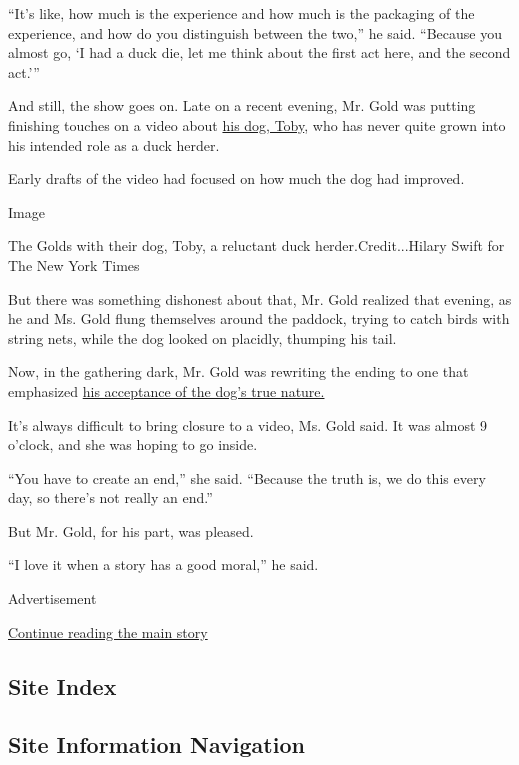 ``It's like, how much is the experience and how much is the packaging of
the experience, and how do you distinguish between the two,'' he said.
``Because you almost go, `I had a duck die, let me think about the first
act here, and the second act.'''

And still, the show goes on. Late on a recent evening, Mr. Gold was
putting finishing touches on a video about
\href{https://www.youtube.com/watch?v=JAX2ARoZoks}{his dog, Toby}, who
has never quite grown into his intended role as a duck herder.

Early drafts of the video had focused on how much the dog had improved.

Image

The Golds with their dog, Toby, a reluctant duck herder.Credit...Hilary
Swift for The New York Times

But there was something dishonest about that, Mr. Gold realized that
evening, as he and Ms. Gold flung themselves around the paddock, trying
to catch birds with string nets, while the dog looked on placidly,
thumping his tail.

Now, in the gathering dark, Mr. Gold was rewriting the ending to one
that emphasized \href{https://www.youtube.com/watch?v=EHMZ6YmiJ8U}{his
acceptance of the dog's true nature.}

It's always difficult to bring closure to a video, Ms. Gold said. It was
almost 9 o'clock, and she was hoping to go inside.

``You have to create an end,'' she said. ``Because the truth is, we do
this every day, so there's not really an end.''

But Mr. Gold, for his part, was pleased.

``I love it when a story has a good moral,'' he said.

Advertisement

\protect\hyperlink{after-bottom}{Continue reading the main story}

\hypertarget{site-index}{%
\subsection{Site Index}\label{site-index}}

\hypertarget{site-information-navigation}{%
\subsection{Site Information
Navigation}\label{site-information-navigation}}

